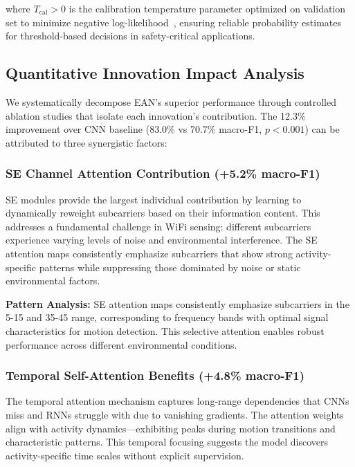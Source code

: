 \documentclass[lettersize,journal]{IEEEtran}
\begin{document}
where $T_{\text{cal}} > 0$ is the calibration temperature parameter optimized on validation set to minimize negative log-likelihood~\cite{calibration_guo2017}, ensuring reliable probability estimates for threshold-based decisions in safety-critical applications.

\subsection{Quantitative Innovation Impact Analysis}

We systematically decompose EAN's superior performance through controlled ablation studies that isolate each innovation's contribution. The 12.3\% improvement over CNN baseline (83.0\% vs 70.7\% macro-F1, $p<0.001$) can be attributed to three synergistic factors:

\subsubsection{SE Channel Attention Contribution (+5.2\% macro-F1)}

SE modules provide the largest individual contribution by learning to dynamically reweight subcarriers based on their information content. This addresses a fundamental challenge in WiFi sensing: different subcarriers experience varying levels of noise and environmental interference. The SE attention maps consistently emphasize subcarriers that show strong activity-specific patterns while suppressing those dominated by noise or static environmental factors.

\textbf{Pattern Analysis:} SE attention maps consistently emphasize subcarriers in the 5-15 and 35-45 range, corresponding to frequency bands with optimal signal characteristics for motion detection. This selective attention enables robust performance across different environmental conditions.

\subsubsection{Temporal Self-Attention Benefits (+4.8\% macro-F1)}

The temporal attention mechanism captures long-range dependencies that CNNs miss and RNNs struggle with due to vanishing gradients. The attention weights align with activity dynamics—exhibiting peaks during motion transitions and characteristic patterns. This temporal focusing suggests the model discovers activity-specific time scales without explicit supervision.
\end{document}
